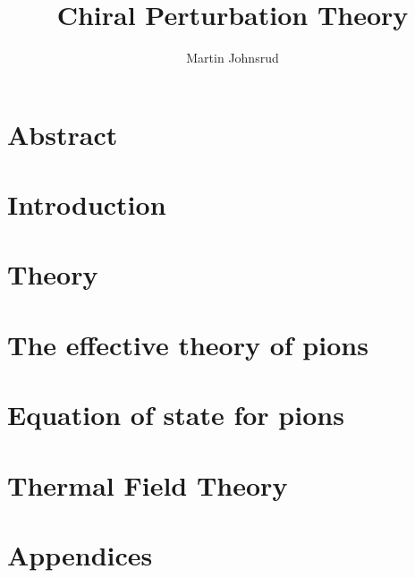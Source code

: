 \documentclass{book}
\title{Chiral Perturbation Theory}
\author{Martin Johnsrud}
\begin{document}
\maketitle 

\tableofcontents

\chapter*{Abstract}


\chapter{Introduction}



\chapter{Theory}





\chapter{The effective theory of pions}
\label{serction:effective_pion_lagrangian}








\chapter{Equation of state for pions}




\appendix

\chapter{Thermal Field Theory}
\label{section:thermal field theory}







\chapter{Appendices}





\end{document}
